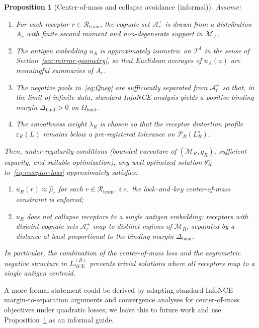\documentclass[11pt]{article}
\newcommand{\Ical}{\mathcal{I}}
\newcommand{\Rcal}{\mathcal{R}}
\newcommand{\M}{\mathcal{M}}
\newcommand{\Pcal}{\mathcal{P}}
\newcommand{\Acal}{\mathcal{A}}
\newtheorem{proposition}{Proposition}
\begin{document}
\begin{proposition}[Center-of-mass and collapse avoidance (informal)]
\label{prop:center-of-mass}
Assume:

\begin{enumerate}
  \item[(i)] For each receptor $r \in \Rcal_{\mathrm{train}}$, the cognate set
    $\Acal_r^+$ is drawn from a distribution $A_r$ with finite second moment
    and non-degenerate support in $\M_A$.
  \item[(ii)] The antigen embedding $u_A$ is approximately isometric on
    $\Ical^A$ in the sense of Section~\ref{sec:mirror-geometry}, so that
    Euclidean averages of $u_A(a)$ are meaningful summaries of $A_r$.
  \item[(iii)] The negative pools in~\eqref{eq:Qneg} are sufficiently separated
    from $\Acal_r^+$ so that, in the limit of infinite data, standard InfoNCE
    analysis yields a positive binding margin $\Delta_{\mathrm{bind}}>0$ on
    $\Omega_{\mathrm{bind}}$.
  \item[(iv)] The smoothness weight $\lambda_R$ is chosen so that the receptor
    distortion profile $\varepsilon_R(L)$ remains below a pre-registered
    tolerance on $\Pcal_R(L_R^\star)$.
\end{enumerate}

Then, under regularity conditions (bounded curvature of $(\M_R,g_R)$, sufficient
capacity, and suitable optimization), any well-optimized solution
$\theta_R^\star$ to~\eqref{eq:receptor-loss} approximately satisfies:

\begin{enumerate}
  \item $u_R(r) \approx \hat{\mu}_r$ for each $r \in \Rcal_{\mathrm{train}}$,
    i.e.\ the lock–and–key center-of-mass constraint is enforced;
  \item $u_R$ does not collapse receptors to a single antigen embedding:
    receptors with disjoint cognate sets $\Acal_r^+$ map to distinct regions of
    $\M_R$, separated by a distance at least proportional to the binding margin
    $\Delta_{\mathrm{bind}}$.
\end{enumerate}

In particular, the combination of the center-of-mass loss and the asymmetric
negative structure in $L_{\mathrm{NCE}}^{(R)}$ prevents trivial solutions where
all receptors map to a single antigen centroid.
\end{proposition}

A more formal statement could be derived by adapting standard InfoNCE
margin-to-separation arguments and convergence analyses for center-of-mass
objectives under quadratic losses; we leave this to future work and use
Proposition~\ref{prop:center-of-mass} as an informal guide.
\end{document}
